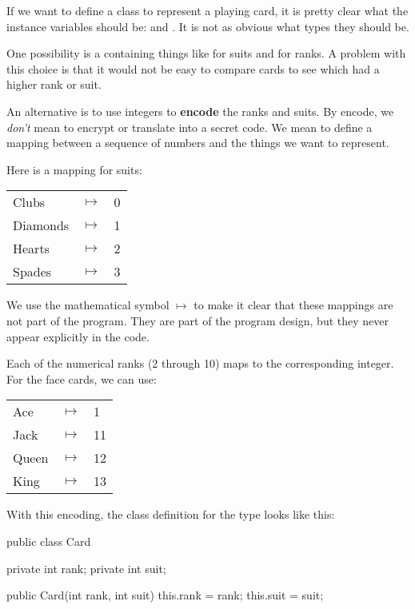
If we want to define a class to represent a playing card, it is pretty clear what the instance variables should be:  and .
It is not as obvious what types they should be.

One possibility is a  containing things like  for suits and  for ranks.
A problem with this choice is that it would not be easy to compare cards to see which had a higher rank or suit.


An alternative is to use integers to {\bf encode} the ranks and suits.
By encode, we {\em don't} mean to encrypt or translate into a secret code.
We mean to define a mapping between a sequence of numbers and the things we want to represent.

Here is a mapping for suits:

\begin{tabular}{l c l}
Clubs & $\mapsto$ & 0 \\
Diamonds & $\mapsto$ & 1 \\
Hearts & $\mapsto$ & 2 \\
Spades & $\mapsto$ & 3
\end{tabular}


We use the mathematical symbol $\mapsto$ to make it clear that these mappings are not part of the program.
They are part of the program design, but they never appear explicitly in the code.

Each of the numerical ranks (2 through 10) maps to the corresponding integer.
For the face cards, we can use:

\begin{tabular}{l c l}
Ace & $\mapsto$ & 1 \\
Jack & $\mapsto$ & 11 \\
Queen & $\mapsto$ & 12 \\
King & $\mapsto$ & 13 \\
\end{tabular}

With this encoding, the class definition for the  type looks like this:

\begin{code}
public class Card {
    private int rank;
    private int suit;

    public Card(int rank, int suit) {
        this.rank = rank;
        this.suit = suit;
    }
}
\end{code}

